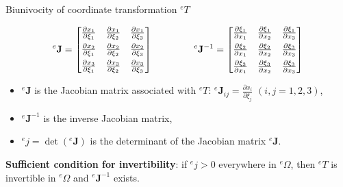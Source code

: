 \documentclass[aspectratio=169]{beamer}
\begin{document}
\begin{frame}{Biunivocity of coordinate transformation ${}^eT$}
  \begin{block}{}
    $$
      ^{e} \mathbf{J} =
      \begin{bmatrix}
        \frac{\partial x_1}{\partial \xi_1} & \frac{\partial x_1}{\partial \xi_2} & \frac{\partial x_1}{\partial \xi_3} \\[5pt]
        \frac{\partial x_2}{\partial \xi_1} & \frac{\partial x_2}{\partial \xi_2} & \frac{\partial x_2}{\partial \xi_3} \\[5pt]
        \frac{\partial x_3}{\partial \xi_1} & \frac{\partial x_3}{\partial \xi_2} & \frac{\partial x_3}{\partial \xi_3}
      \end{bmatrix}\hspace{1.5cm}
      {}^{e} \mathbf{J}^{-1} =
      \begin{bmatrix}
        \frac{\partial \xi_1}{\partial x_1} & \frac{\partial \xi_1}{\partial x_2} & \frac{\partial \xi_1}{\partial x_3} \\[5pt]
        \frac{\partial \xi_2}{\partial x_1} & \frac{\partial \xi_2}{\partial x_2} & \frac{\partial \xi_3}{\partial x_3} \\[5pt]
        \frac{\partial \xi_3}{\partial x_1} & \frac{\partial \xi_3}{\partial x_2} & \frac{\partial \xi_3}{\partial x_3}
      \end{bmatrix}
    $$
    \begin{itemize}
      \item \({}^{e} \mathbf{J}\) is the Jacobian matrix associated with  \({}^{e}T\):  ${}^e\mathbf{J}_{ij} = \frac{\partial x_i}{\partial \xi_j}$ $(i,j=1,2,3)$,
      \item   \({}^{e} \mathbf{J}^{-1}\) is the inverse Jacobian matrix,
      \item  \( {}^e j =\det({}^{e} \mathbf{J})\) is the determinant of the Jacobian matrix \( {}^e \mathbf{J} \).
    \end{itemize}
    \vspace{0.3cm}
    \textbf{Sufficient condition for invertibility}: if ${}^{e} j>0$ everywhere in ${}^e\Omega$, then  \({}^{e}T\) is invertible in ${}^e\Omega$ and \({}^{e} \mathbf{J}^{-1}\) exists.
  \end{block}

\end{frame}
\end{document}
